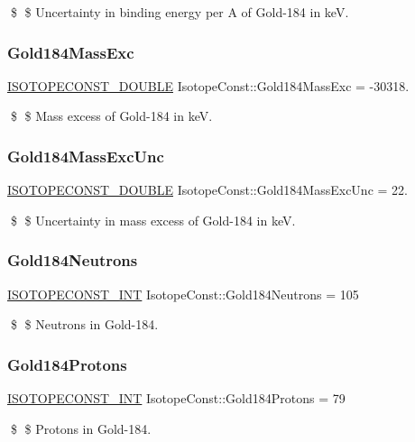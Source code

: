 \$ \$ Uncertainty in binding energy per A of Gold-\/184 in keV. \mbox{\label{group___isotope_const-_gold-_au184_ga72f5c53d567944b581d55b8eba7b71b2}} 
\subsubsection{\texorpdfstring{Gold184\+Mass\+Exc}{Gold184MassExc}}
{\footnotesize\ttfamily \mbox{\hyperlink{group___isotope_const-_macros_ga8f45a7272ce02c0b4c65c44636ed719a}{I\+S\+O\+T\+O\+P\+E\+C\+O\+N\+S\+T\+\_\+\+D\+O\+U\+B\+LE}} Isotope\+Const\+::\+Gold184\+Mass\+Exc = -\/30318.}

\$ \$ Mass excess of Gold-\/184 in keV. \mbox{\label{group___isotope_const-_gold-_au184_ga711d20cfc21babf943c133df440c6e20}} 
\subsubsection{\texorpdfstring{Gold184\+Mass\+Exc\+Unc}{Gold184MassExcUnc}}
{\footnotesize\ttfamily \mbox{\hyperlink{group___isotope_const-_macros_ga8f45a7272ce02c0b4c65c44636ed719a}{I\+S\+O\+T\+O\+P\+E\+C\+O\+N\+S\+T\+\_\+\+D\+O\+U\+B\+LE}} Isotope\+Const\+::\+Gold184\+Mass\+Exc\+Unc = 22.}

\$ \$ Uncertainty in mass excess of Gold-\/184 in keV. \mbox{\label{group___isotope_const-_gold-_au184_ga9508ce7a1596417d3f5aa4d55e832c6c}} 
\subsubsection{\texorpdfstring{Gold184\+Neutrons}{Gold184Neutrons}}
{\footnotesize\ttfamily \mbox{\hyperlink{group___isotope_const-_macros_ga5f18360b3e99483a35c32d789e62621c}{I\+S\+O\+T\+O\+P\+E\+C\+O\+N\+S\+T\+\_\+\+I\+NT}} Isotope\+Const\+::\+Gold184\+Neutrons = 105}

\$ \$ Neutrons in Gold-\/184. \mbox{\label{group___isotope_const-_gold-_au184_ga745f3d213d7bd05d7e392113d066cb39}} 
\subsubsection{\texorpdfstring{Gold184\+Protons}{Gold184Protons}}
{\footnotesize\ttfamily \mbox{\hyperlink{group___isotope_const-_macros_ga5f18360b3e99483a35c32d789e62621c}{I\+S\+O\+T\+O\+P\+E\+C\+O\+N\+S\+T\+\_\+\+I\+NT}} Isotope\+Const\+::\+Gold184\+Protons = 79}

\$ \$ Protons in Gold-\/184. 